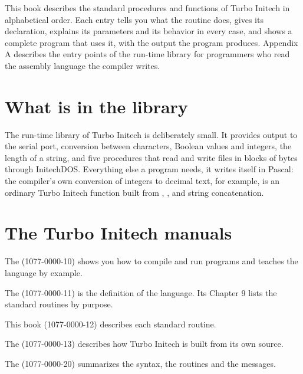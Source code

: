 \IntroductionChapter

This book describes the standard procedures and functions of Turbo
Initech\reg{} in alphabetical order.  Each entry tells you what the routine
does, gives its declaration, explains its parameters and its behavior in
every case, and shows a complete program that uses it, with the output the
program produces.  Appendix A describes the entry points of the run-time
library for programmers who read the assembly language the compiler
writes.

\section{What is in the library}
The run-time library of Turbo Initech is deliberately small.  It provides
output to the serial port, conversion between characters, Boolean values
and integers, the length of a string, and five procedures that read and
write files in blocks of bytes through InitechDOS.  Everything else a
program needs, it writes itself in Pascal: the compiler's own conversion of
integers to decimal text, for example, is an ordinary Turbo Initech
function built from , ,  and string
concatenation.

\section{The Turbo Initech manuals}
The 
(1077-0000-10) shows you how to compile and run programs and teaches the
language by example.

The  (1077-0000-11) is the definition of the language.  Its Chapter 9
lists the standard routines by purpose.

This book (1077-0000-12) describes each
standard routine.

The  (1077-0000-13) describes how Turbo Initech is built
from its own source.

The 
(1077-0000-20) summarizes the syntax, the routines and the messages.

